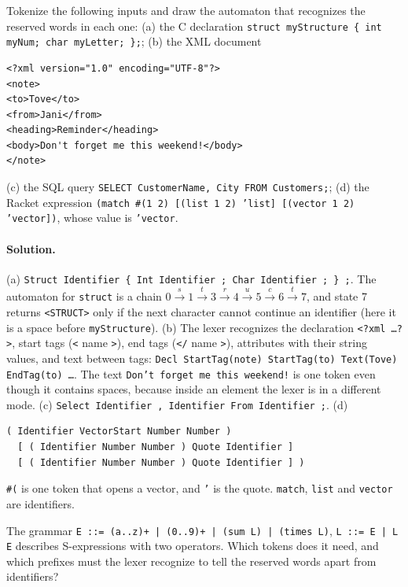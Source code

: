 \begin{exercise}
Tokenize the following inputs and draw the automaton that recognizes the
reserved words in each one: (a) the C declaration
\texttt{struct myStructure \{ int myNum; char myLetter; \};}; (b) the XML
document
\begin{lstlisting}
<?xml version="1.0" encoding="UTF-8"?>
<note>
<to>Tove</to>
<from>Jani</from>
<heading>Reminder</heading>
<body>Don't forget me this weekend!</body>
</note>
\end{lstlisting}
(c) the SQL query \texttt{SELECT CustomerName, City FROM Customers;}; (d) the
Racket expression
\texttt{(match \#(1 2) [(list 1 2) 'list] [(vector 1 2) 'vector])}, whose value
is \texttt{'vector}.
\end{exercise}

\paragraph{Solution.}
(a) \texttt{Struct Identifier \{ Int Identifier ; Char Identifier ; \} ;}. The
automaton for \texttt{struct} is a chain $0 \xrightarrow{s} 1 \xrightarrow{t} 3
\xrightarrow{r} 4 \xrightarrow{u} 5 \xrightarrow{c} 6 \xrightarrow{t} 7$, and state 7
returns \texttt{<STRUCT>} only if the next character cannot continue an
identifier (here it is a space before \texttt{myStructure}).
(b) The lexer recognizes the declaration \texttt{<?xml \dots ?>}, start tags
(\texttt{<} name \texttt{>}), end tags (\texttt{</} name \texttt{>}), attributes with
their string values, and text between tags: \texttt{Decl StartTag(note)
StartTag(to) Text(Tove) EndTag(to) \dots}. The text \texttt{Don't forget me this
weekend!} is one token even though it contains spaces, because inside an
element the lexer is in a different mode.
(c) \texttt{Select Identifier , Identifier From Identifier ;}.
(d)
\begin{lstlisting}
( Identifier VectorStart Number Number )
  [ ( Identifier Number Number ) Quote Identifier ]
  [ ( Identifier Number Number ) Quote Identifier ] )
\end{lstlisting}
\texttt{\#(} is one token that opens a vector, and \texttt{'} is the quote.
\texttt{match}, \texttt{list} and \texttt{vector} are identifiers.

\begin{exercise}
The grammar
\texttt{E ::= (a..z)+ | (0..9)+ | (sum L) | (times L)},
\texttt{L ::= E | L E}
describes S-expressions with two operators. Which tokens does it need, and
which prefixes must the lexer recognize to tell the reserved words apart from
identifiers?
\end{exercise}

